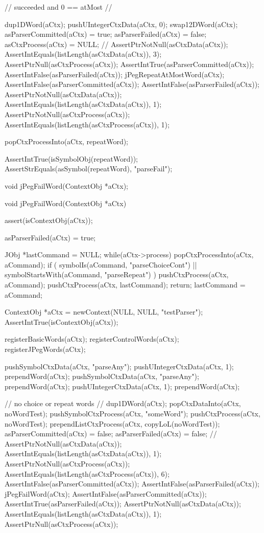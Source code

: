   // succeeded and 0 == atMost 
  //
  {
  dup1DWord(aCtx);
  pushUIntegerCtxData(aCtx, 0);
  swap12DWord(aCtx);
  asParserCommitted(aCtx) = true;
  asParserFailed(aCtx) = false;
  asCtxProcess(aCtx) = NULL;
  //
  AssertPtrNotNull(asCtxData(aCtx));
  AssertIntEquals(listLength(asCtxData(aCtx)), 3);
  AssertPtrNull(asCtxProcess(aCtx));
  AssertIntTrue(asParserCommitted(aCtx));
  AssertIntFalse(asParserFailed(aCtx));
  jPegRepeatAtMostWord(aCtx);
  AssertIntFalse(asParserCommitted(aCtx));
  AssertIntFalse(asParserFailed(aCtx));
  AssertPtrNotNull(asCtxData(aCtx));
  AssertIntEquals(listLength(asCtxData(aCtx)), 1);
  AssertPtrNotNull(asCtxProcess(aCtx));
  AssertIntEquals(listLength(asCtxProcess(aCtx)), 1);
    
  popCtxProcessInto(aCtx, repeatWord);
  
  AssertIntTrue(isSymbolObj(repeatWord));
  AssertStrEquals(asSymbol(repeatWord), "parseFail");
  }
\stopCTest
\stopTestCase
\stopTestSuite

\startTestSuite[jPegFailWord]

\startCHeader
void jPegFailWord(ContextObj *aCtx);
\stopCHeader

\startCCode
void jPegFailWord(ContextObj *aCtx) {
  assert(isContextObj(aCtx));

  asParserFailed(aCtx) = true;
  
  JObj *lastCommand = NULL;
  while(aCtx->process) {
    popCtxProcessInto(aCtx, aCommand);
    if (
      symbolIs(aCommand, "parseChoiceCont") ||
      symbolStartsWith(aCommand, "parseRepeat")
    ) {
      pushCtxProcess(aCtx, aCommand);
      pushCtxProcess(aCtx, lastCommand);
      return;
    }
    lastCommand = aCommand;
  }
}
\stopCCode


\startCTest
  ContextObj *aCtx = newContext(NULL, NULL, "testParser");
  AssertIntTrue(isContextObj(aCtx));
  
  registerBasicWords(aCtx);
  registerControlWords(aCtx);
  registerJPegWords(aCtx);
  
  pushSymbolCtxData(aCtx, "parseAny");
  pushUIntegerCtxData(aCtx, 1);
  prependWord(aCtx);
  pushSymbolCtxData(aCtx, "parseAny");
  prependWord(aCtx);
  pushUIntegerCtxData(aCtx, 1);
  prependWord(aCtx);  

  // no choice or repeat words
  //
  {
  dup1DWord(aCtx);
  popCtxDataInto(aCtx, noWordTest);
  pushSymbolCtxProcess(aCtx, "someWord");
  pushCtxProcess(aCtx, noWordTest);
  prependListCtxProcess(aCtx, copyLoL(noWordTest));
  asParserCommitted(aCtx) = false;
  asParserFailed(aCtx) = false;
  //
  AssertPtrNotNull(asCtxData(aCtx));
  AssertIntEquals(listLength(asCtxData(aCtx)), 1);
  AssertPtrNotNull(asCtxProcess(aCtx));
  AssertIntEquals(listLength(asCtxProcess(aCtx)), 6);
  AssertIntFalse(asParserCommitted(aCtx));
  AssertIntFalse(asParserFailed(aCtx));
  jPegFailWord(aCtx);
  AssertIntFalse(asParserCommitted(aCtx));
  AssertIntTrue(asParserFailed(aCtx));
  AssertPtrNotNull(asCtxData(aCtx));
  AssertIntEquals(listLength(asCtxData(aCtx)), 1);
  AssertPtrNull(asCtxProcess(aCtx));
  }
  
